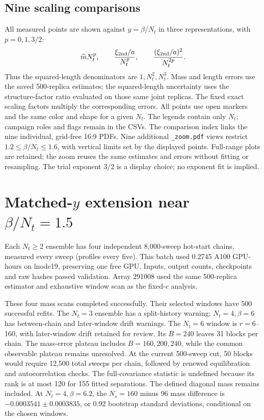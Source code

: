 \documentclass[11pt,a4paper]{article}
\begin{document}
\subsection*{Nine scaling comparisons}
All measured points are shown against $y=\beta/N_t$ in three representations,
with $p=0,1,3/2$:
\[
  \widehat m N_t^p,\qquad
  \frac{\xi_{\rm 2nd}/a}{N_t^p},\qquad
  \frac{(\xi_{\rm 2nd}/a)^2}{N_t^{2p}}.
\]
Thus the squared-length denominators are $1,N_t^2,N_t^3$. Mass and length
errors use the saved 500-replica estimates; the squared-length uncertainty
uses the structure-factor ratio evaluated on those same joint replicas.
The fixed exact scaling factors multiply the corresponding errors.
All points use open markers and the same color and shape for a given $N_t$.
The legends contain only $N_t$; campaign roles and flags remain in the CSVs.
The comparison index links the nine individual, grid-free 16:9 PDFs.
Nine additional \texttt{\_zoom.pdf} views restrict $1.2\leq\beta/N_t\leq1.6$,
with vertical limits set by the displayed points. Full-range plots are retained;
the zoom reuses the same estimates and errors without fitting or resampling.
The trial exponent $3/2$ is a display choice; no exponent fit is implied.

\clearpage\section*{Matched-$y$ extension near $\beta/N_t=1.5$}
\begin{center}\small\end{center}
Each $N_t\geq2$ ensemble has four independent 8,000-sweep hot-start chains,
measured every sweep (profiles every five). This batch used 0.2745 A100 GPU-hours on
lnode19, preserving one free GPU. Inputs, output counts, checkpoints and
raw hashes passed validation. Array 291008 used the same 500-replica
estimator and exhaustive window scan as the fixed-$c$ analysis.

These four mass scans completed successfully. Their selected windows have
500 successful refits. The $N_t=3$ ensemble has a split-history warning;
$N_t=4,\beta=6$ has between-chain and later-window drift warnings. The
$N_t=6$ window is $r=6$--160, with later-window drift retained for review.
Its $B=240$ leaves 31 blocks per chain. The mass-error plateau includes
$B=160,200,240$, while the common observable plateau remains unresolved.
At the current 500-sweep cut, 50 blocks would require 12,500 total sweeps per
chain, followed by renewed equilibration and autocorrelation checks.
The full-covariance statistic is undefined because its rank is at most
120 for 155 fitted separations. The defined diagonal mass remains included.
At $N_t=4,\beta=6.2$, the $N_s=160$ minus 96 mass difference is
$-0.0003541\pm0.0003835$, or 0.92 bootstrap standard deviations, conditional
on the chosen windows.
\end{document}
